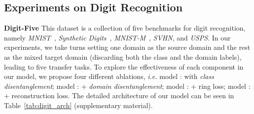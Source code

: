 \documentclass{article}
\begin{document}
\vspace{-0.3cm}
\subsection{Experiments on Digit Recognition}
\label{exp_digit}
\textbf{Digit-Five} This dataset is a collection of five benchmarks for digit recognition, namely \textit{MNIST}~\cite{lecun1998gradient}, \textit{Synthetic Digits}~\cite{DANN}, \textit{MNIST-M}~\cite{DANN}, \textit{SVHN}, and \textit{USPS}. In our experiments, we take turns setting one domain as the source domain and the rest as the mixed target domain (discarding both the class and the domain labels), leading to five transfer tasks. To explore the effectiveness of each component in our model, we propose four different ablations, \textit{i.e.} model \textbf{}: with \textit{class disentanglement}; model \textbf{}: \textbf{} + \textit{domain disentanglement}; model \textbf{}: \textbf{} + ring loss; model \textbf{}: \textbf{} + reconstruction loss. The detailed architecture of our model can be seen in Table~\ref{tab:digit_arch} (supplementary material).
\end{document}
